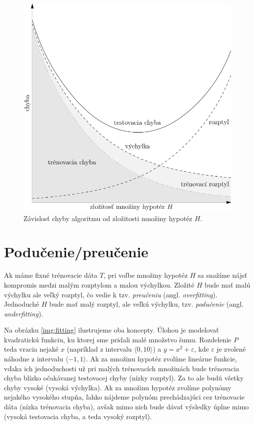 \begin{figure}
  \centering
  \includegraphics[scale=0.8]{obrazky/krivky2.pdf}
  \caption{Závislosť chyby algoritmu od zložitosti množiny hypotéz $H$.}
  \label{img:hypo}
\end{figure}




\section{Podučenie/preučenie}

Ak máme fixné trénovacie dáta $T$, pri voľbe množiny hypotéz $H$ sa snažíme
nájsť kompromis medzi malým rozptylom a malou výchylkou. Zložité $H$
bude mať malú výchylku ale veľký rozptyl, čo vedie k tzv. \emph{preučeniu}
(angl. \emph{overfitting}). Jednoduché $H$ bude mať malý rozptyl, ale
veľkú výchylku, tzv. \emph{podučenie} (angl. \emph{underfitting}).

Na obrázku \ref{img:fitting} ilustrujeme oba koncepty. Úlohou je modelovať
kvadratickú funkciu, ku ktorej sme pridali malé množstvo šumu. Rozdelenie
$P$ teda vracia nejaké $x$ (napríklad z intervalu $\langle 0, 10 \rangle$)
a $y = x^2 + \varepsilon$, kde $\varepsilon$ je zvolené náhodne z intervalu
$\langle -1, 1 \rangle$. Ak za množinu hypotéz zvolíme lineárne funkcie,
vďaka ich jednoduchosti už pri malých trénovacích množinách bude trénovacia
chyba blízko očakávanej testovacej chyby (nízky rozptyl). Za to ale budú
všetky chyby vysoké (vysoká výchylka). Ak za množinu hypotéz zvolíme polynómy
nejakého vysokého stupňa, ľahko nájdeme polynóm prechádzajúci cez trénovacie
dáta (nízka trénovacia chyba), avšak mimo nich bude dávať výsledky úplne mimo
(vysoká testovacia chyba, a teda vysoký rozptyl).

